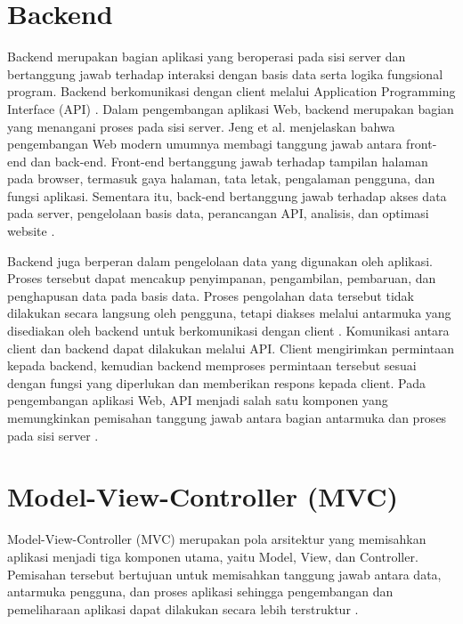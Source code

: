 
\section{Backend}

Backend merupakan bagian aplikasi yang beroperasi pada sisi server dan bertanggung jawab terhadap interaksi dengan basis data serta logika fungsional program. Backend berkomunikasi dengan client melalui Application Programming Interface (API) \parencite{Nurhayati2023}. Dalam pengembangan aplikasi Web, backend merupakan bagian yang menangani proses pada sisi server. Jeng et al. menjelaskan bahwa pengembangan Web modern umumnya membagi tanggung jawab antara front-end dan back-end. Front-end bertanggung jawab terhadap tampilan halaman pada browser, termasuk gaya halaman, tata letak, pengalaman pengguna, dan fungsi aplikasi. Sementara itu, back-end bertanggung jawab terhadap akses data pada server, pengelolaan basis data, perancangan API, analisis, dan optimasi website \parencite{Jeng2021}.

Backend juga berperan dalam pengelolaan data yang digunakan oleh aplikasi. Proses tersebut dapat mencakup penyimpanan, pengambilan, pembaruan, dan penghapusan data pada basis data. Proses pengolahan data tersebut tidak dilakukan secara langsung oleh pengguna, tetapi diakses melalui antarmuka yang disediakan oleh backend untuk berkomunikasi dengan client \parencite{Nurhayati2023}. Komunikasi antara client dan backend dapat dilakukan melalui API. Client mengirimkan permintaan kepada backend, kemudian backend memproses permintaan tersebut sesuai dengan fungsi yang diperlukan dan memberikan respons kepada client. Pada pengembangan aplikasi Web, API menjadi salah satu komponen yang memungkinkan pemisahan tanggung jawab antara bagian antarmuka dan proses pada sisi server \parencite{Jeng2021,Nurhayati2023}.

\section{Model-View-Controller (MVC)}

Model-View-Controller (MVC) merupakan pola arsitektur yang memisahkan aplikasi menjadi tiga komponen utama, yaitu Model, View, dan Controller. Pemisahan tersebut bertujuan untuk memisahkan tanggung jawab antara data, antarmuka pengguna, dan proses aplikasi sehingga pengembangan dan pemeliharaan aplikasi dapat dilakukan secara lebih terstruktur
\parencite{Purbo2021}.

